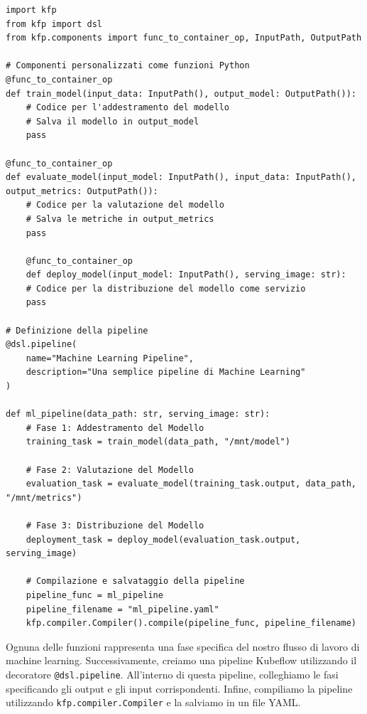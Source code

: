 \begin{code}
\label{code:apx:a:python}
\begin{verbatim}
import kfp
from kfp import dsl
from kfp.components import func_to_container_op, InputPath, OutputPath
    
# Componenti personalizzati come funzioni Python
@func_to_container_op
def train_model(input_data: InputPath(), output_model: OutputPath()):
    # Codice per l'addestramento del modello
    # Salva il modello in output_model
    pass
    
@func_to_container_op
def evaluate_model(input_model: InputPath(), input_data: InputPath(), output_metrics: OutputPath()):
    # Codice per la valutazione del modello
    # Salva le metriche in output_metrics
    pass
    
    @func_to_container_op
    def deploy_model(input_model: InputPath(), serving_image: str):
    # Codice per la distribuzione del modello come servizio
    pass
    
# Definizione della pipeline
@dsl.pipeline(
    name="Machine Learning Pipeline",
    description="Una semplice pipeline di Machine Learning"
)

def ml_pipeline(data_path: str, serving_image: str):
    # Fase 1: Addestramento del Modello
    training_task = train_model(data_path, "/mnt/model")
    
    # Fase 2: Valutazione del Modello
    evaluation_task = evaluate_model(training_task.output, data_path, "/mnt/metrics")
    
    # Fase 3: Distribuzione del Modello
    deployment_task = deploy_model(evaluation_task.output, serving_image)
    
    # Compilazione e salvataggio della pipeline
    pipeline_func = ml_pipeline
    pipeline_filename = "ml_pipeline.yaml"
    kfp.compiler.Compiler().compile(pipeline_func, pipeline_filename)
\end{verbatim}
\end{code}
Ognuna delle funzioni rappresenta una fase specifica del nostro flusso di lavoro di machine learning. Successivamente, creiamo una pipeline Kubeflow utilizzando il decoratore {\small \verb|@dsl.pipeline|}. All'interno di questa pipeline, colleghiamo le fasi specificando gli output e gli input corrispondenti. Infine, compiliamo la pipeline utilizzando {\small \verb|kfp.compiler.Compiler|} e la salviamo in un file YAML.

